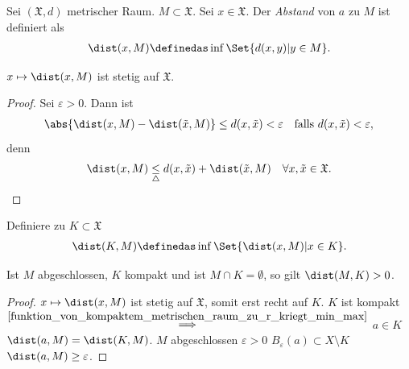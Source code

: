 \begin{beispiel*}
    Sei \( (\mathfrak{X},d)\) metrischer Raum. \( M\subset \mathfrak{X}\). Sei \( x\in \mathfrak{X}\). Der \emph{Abstand} von \( a\) zu \( M\) ist definiert als
    \begin{align*}
        \dist(x,M)\definedas \inf\Set{d(x,y)|y\in M}.
    \end{align*} 
    \begin{behauptung*}
        \( x\mapsto \dist(x,M)\) ist stetig auf \( \mathfrak{X}\). 
    \end{behauptung*}
    \begin{proof}
        Sei \( \varepsilon>0\). Dann ist
        \begin{align*}
            \abs{\dist(x,M)-\dist(\tilde{x},M)}\leq d(x,\tilde{x})<\varepsilon \quad \text{falls }d(x,\tilde{x})<\varepsilon, 
        \end{align*}
        denn
        \begin{align*}
            \dist(x,M)\underset{\triangle}{\leq}d(x,\tilde{x})+\dist(\tilde{x},M)\quad \forall x,\tilde{x}\in \mathfrak{X}.
        \end{align*}
        
    \end{proof}
    Definiere zu \( K\subset \mathfrak{X} \)
    \begin{align*}
        \dist(K,M)\definedas \inf\Set{\dist(x,M)|x\in K}.
    \end{align*}
    \begin{behauptung*}
        Ist \( M \) abgeschlossen, \( K \) kompakt und ist \( M\cap K=\emptyset \), so gilt \( \dist(M,K)>0 \).
    \end{behauptung*}
    \begin{proof}
        \( x\mapsto \dist(x,M) \) ist stetig auf \( \mathfrak{X} \), somit erst recht auf \( K \). \( K \) ist kompakt \( \overset{\ref{funktion_von_kompaktem_metrischen_raum_zu_r_kriegt_min_max}}{\implies} \) \texists \( a\in K \) \sd \( \dist(a,M)=\dist(K,M) \). \( M \) abgeschlossen \timplies \texists \( \varepsilon>0 \) \sd \( B_{\varepsilon}(a)\subset X\setminus K \) \timplies \( \dist(a,M)\geq \varepsilon \).
        

\end{proof}
\end{beispiel*}
